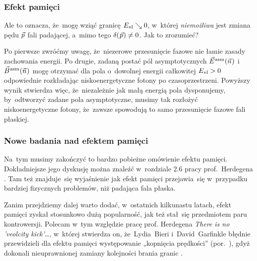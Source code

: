 \documentclass[10pt,t]{beamer}
\begin{document}
\begin{frame}
  \frametitle{Efekt pamięci}


  Ale to oznacza, że~mogę wziąć granicę $E_{ \hspace{0.05em} \text{el} } \searrow 0$,
  w~której \textit{niemożliwa} jest zmiana pędu $\vec{p}$ fali padającej,
  a~mimo tego $\delta( \hspace{0.05em} \vec{p} \hspace{0.05em} ) \neq 0$. Jak to zrozumieć?

  Po pierwsze zwróćmy uwagę, że~niezerowe przesunięcie fazowe nie łamie
  zasady zachowania energii. Po drugie, zadaną postać pól asymptotycznych
  $\vec{E}^{ \hspace{0.05em} \text{asm} }( \vec{n} \hspace{0.05em} )$ i~$\vec{B}^{ \hspace{0.05em} \text{asm} }( \vec{n} \hspace{0.05em} )$ mogę otrzymać dla pola o~dowolnej energii
  całkowitej $E_{ \hspace{0.05em} \text{el} } > 0$ odpowiednie rozkładając
  niskoenergetyczne fotony po czasoprzestrzeni. Powyższy wynik stwierdza
  więc, że~niezależnie jak małą energią pola dysponujemy, by~odtworzyć
  zadane pola asymptotyczne, musimy tak rozłożyć niskoenergetyczne fotony,
  że~zawsze spowodują to samo przesunięcie fazowe fali płaskiej.


\end{frame}





\begin{frame}
  \frametitle{Nowe badania nad efektem pamięci}


  Na~tym musimy zakończyć to bardzo pobieżne omówienie efektu pamięci.
  Dokładniejsze jego dyskusję można znaleźć w~rozdziale $2.6$ pracy
  prof.~Herdegena
  \parencite{Herdegen-Infrared-structure-beyond-locality-ETC-Ver-2024}. Tam
  też znajduje~się wyjaśnienie jak efekt pamięci przejawia~się w~przypadku
  bardziej fizycznych problemów, niż padająca fala płaska.

  Zanim przejdziemy dalej warto dodać, w~ostatnich
  kilkunastu latach, efekt pamięci zyskał stosunkowo dużą popularność, jak
  też stał~się przedmiotem paru kontrowersji. Polecam w~tym względzie pracę
  prof. Herdegena
  {\textit{There is no 'veolcity kick'\ldots}}, w~której stwierdza on,
  że~Lydia~Bieri i~David~Garfinkle błędnie przewidzieli dla efektu pamięci
  występowanie „kopnięcia prędkości”
  (por.~\parencite{Bieri-Garfinkle-An-electromagnetic-analogue-of-ETC-Pub-2013}),
  gdyż dokonali nieuprawnionej zamiany kolejności brania granic
  \parencite{Herdegen-There-Is-No-Velocity-Kick-Memory-ETC-Pub-2024}.

\end{frame}
\end{document}
